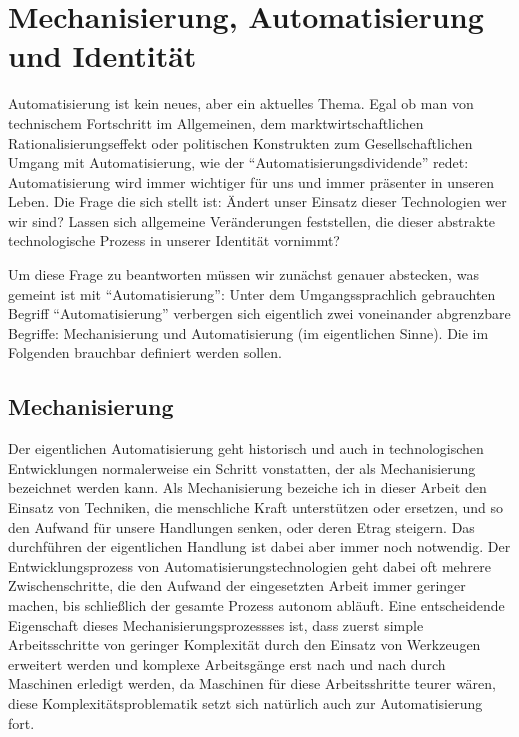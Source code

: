 \section {Mechanisierung, Automatisierung und Identität}

Automatisierung ist kein neues, aber ein aktuelles Thema.
Egal ob man von technischem Fortschritt im Allgemeinen, dem marktwirtschaftlichen Rationalisierungseffekt oder politischen Konstrukten zum Gesellschaftlichen Umgang mit Automatisierung, wie der \enquote{Automatisierungsdividende} redet: Automatisierung wird immer wichtiger für uns und immer präsenter in unseren Leben.
Die Frage die sich stellt ist: Ändert unser Einsatz dieser Technologien wer wir sind? Lassen sich allgemeine Veränderungen feststellen, die dieser abstrakte technologische Prozess in unserer Identität vornimmt?

Um diese Frage zu beantworten müssen wir zunächst genauer abstecken, was gemeint ist mit \enquote{Automatisierung}:
Unter dem Umgangssprachlich gebrauchten Begriff \enquote{Automatisierung} verbergen sich eigentlich zwei voneinander abgrenzbare Begriffe: Mechanisierung und Automatisierung (im eigentlichen Sinne). Die im Folgenden brauchbar definiert werden sollen.

\subsection {Mechanisierung}

Der eigentlichen Automatisierung geht historisch und auch in technologischen Entwicklungen normalerweise ein Schritt vonstatten, der als Mechanisierung bezeichnet werden kann.
Als Mechanisierung bezeiche ich in dieser Arbeit den Einsatz von Techniken, die menschliche Kraft unterstützen oder ersetzen, und so den Aufwand für unsere Handlungen senken, oder deren Etrag steigern.
Das durchführen der eigentlichen Handlung ist dabei aber immer noch notwendig.
Der Entwicklungsprozess von Automatisierungstechnologien geht dabei oft mehrere Zwischenschritte, die den Aufwand der eingesetzten Arbeit immer geringer machen, bis schließlich der gesamte Prozess autonom abläuft.
Eine entscheidende Eigenschaft dieses Mechanisierungsprozessses ist, dass zuerst simple Arbeitsschritte von geringer Komplexität durch den Einsatz von Werkzeugen erweitert werden und komplexe Arbeitsgänge erst nach und nach durch Maschinen erledigt werden, da Maschinen für diese Arbeitsshritte teurer wären, diese Komplexitätsproblematik setzt sich natürlich auch zur Automatisierung fort.


